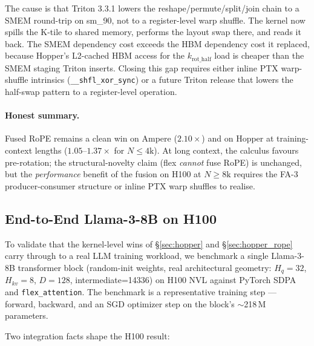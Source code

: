 The cause is that Triton 3.3.1 lowers the reshape/permute/split/join
chain to a SMEM round-trip on sm\_90, not to a register-level warp
shuffle. The kernel now spills the K-tile to shared memory, performs
the layout swap there, and reads it back. The SMEM dependency cost
exceeds the HBM dependency cost it replaced, because Hopper's
L2-cached HBM access for the $k_\text{rot\_half}$ load is cheaper
than the SMEM staging Triton inserts. Closing this gap requires
either inline PTX warp-shuffle intrinsics (\texttt{\_\_shfl\_xor\_sync})
or a future Triton release that lowers the half-swap pattern to a
register-level operation.

\paragraph{Honest summary.} Fused RoPE remains a clean win on Ampere
($2.10\times$) and on Hopper at training-context lengths
($1.05$--$1.37\times$ for $N \leq 4\text{k}$). At long context, the
calculus favours pre-rotation; the structural-novelty claim (flex
\emph{cannot} fuse RoPE) is unchanged, but the \emph{performance}
benefit of the fusion on H100 at $N \geq 8\text{k}$ requires the
FA-3 producer-consumer structure or inline PTX warp shuffles to
realise.


\subsection{End-to-End Llama-3-8B on H100}
\label{sec:hopper_e2e}

To validate that the kernel-level wins of \S\ref{sec:hopper} and
\S\ref{sec:hopper_rope} carry through to a real LLM training workload,
we benchmark a single Llama-3-8B transformer block (random-init
weights, real architectural geometry: $H_q{=}32$, $H_{kv}{=}8$,
$D{=}128$, intermediate=14336) on H100 NVL against PyTorch SDPA
and \texttt{flex\_attention}. The benchmark is a representative
training step --- forward, backward, and an SGD optimizer step on the
block's $\sim$218\,M parameters.

Two integration facts shape the H100 result:

